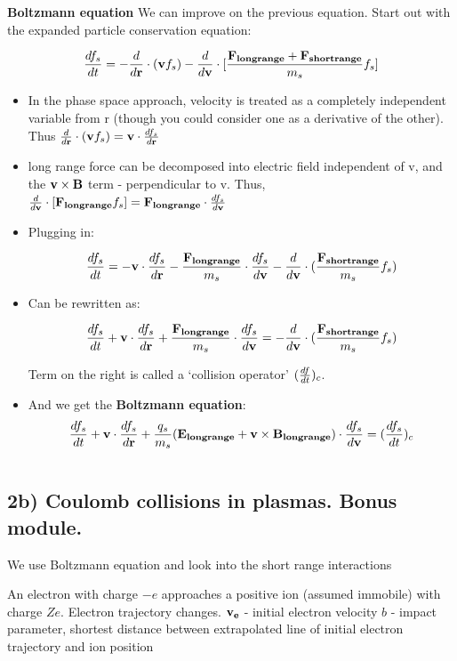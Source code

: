 \textbf{Boltzmann equation}
	We can improve on the previous equation. Start out with the expanded particle conservation equation:
	
\[ \frac{d f_s}{d t} = -\frac{d }{d \mathbf{r}} \cdot (\mathbf{v} f_s) - \frac{d }{d \mathbf{v}} \cdot [\frac{\mathbf{F_{long range}} + \mathbf{F_{short range}}}{m_s} f_s] \]

\begin{itemize}
	\item In the phase space approach, velocity is treated as a completely independent variable from r (though you could consider one as a derivative of the other). Thus $\frac{d }{d \mathbf{r}} \cdot (\mathbf{v} f_s) = \mathbf{v} \cdot	\frac{d f_s}{d \mathbf{r}}$
		\item long range force can be decomposed into electric field independent of v, and the  $\mathbf{v} \times \mathbf{B}$ term - perpendicular to v. Thus, $\frac{d }{d \mathbf{v}} \cdot [\mathbf{F_{long range}} f_s] = \mathbf{F_{long range}}\cdot\frac{d f_s}{d \mathbf{v}} $
	\item Plugging in:
	
	\[ \frac{d f_s}{d t} = -\mathbf{v}\cdot\frac{d f_s}{d \mathbf{r}} - \frac{\mathbf{F_{long range}}}{m_s} \cdot \frac{d f_s}{d \mathbf{v}} - \frac{d }{d \mathbf{v}} \cdot (\frac{\mathbf{F_{short range}}}{m_s} f_s) \]
	\item Can be rewritten as:
	
	\[ \frac{d f_s}{d t} +\mathbf{v}\cdot\frac{d f_s}{d \mathbf{r}} + \frac{\mathbf{F_{long range}}}{m_s} \cdot \frac{d f_s}{d \mathbf{v}} = - \frac{d }{d \mathbf{v}} \cdot (\frac{\mathbf{F_{short range}}}{m_s} f_s) \]
	
	Term on the right is called a `collision operator' $(\frac{d f}{d t})_c$.	
	
\item And we get the \textbf{Boltzmann equation}:
	\[ \frac{d f_s}{d t} +\mathbf{v}\cdot\frac{d f_s}{d \mathbf{r}} + \frac{q_s}{m_s}(\mathbf{E_{long range}} + \mathbf{v} \times \mathbf{B_{long range}}) \cdot \frac{d f_s}{d \mathbf{v}} = (\frac{d f_s}{d t})_c \]
\end {itemize}

\[   \]

\subsection{2b) Coulomb collisions in plasmas. Bonus module.}
We use Boltzmann equation and look into the short range interactions

An electron with charge $-e$ approaches a positive ion (assumed immobile) with charge $Ze$. Electron trajectory changes.
$\mathbf{v_e}$ - initial electron velocity
$b$ - impact parameter, shortest distance between extrapolated line of initial electron trajectory and ion position

